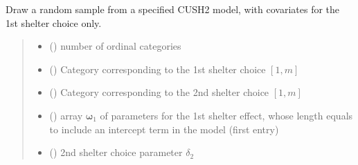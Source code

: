\documentclass[letterpaper,10pt,english]{sphinxmanual}
\begin{document}

\begin{fulllineitems}
\label{\detokenize{cubmods:cubmods.cush2_x0.draw}}
\pysigstartsignatures
{}
\pysigstopsignatures
\sphinxAtStartPar
Draw a random sample from a specified CUSH2 model,
with covariates for the 1st shelter choice only.
\begin{quote}\begin{description}
\begin{itemize}
\item {} 
\sphinxAtStartPar
{} () \textendash{} number of ordinal categories

\item {} 
\sphinxAtStartPar
{} () \textendash{} Category corresponding to the 1st shelter choice \([1,m]\)

\item {} 
\sphinxAtStartPar
{} () \textendash{} Category corresponding to the 2nd shelter choice \([1,m]\)

\item {} 
\sphinxAtStartPar
{} () \textendash{} array \(\pmb \omega_1\) of parameters for the 1st shelter effect, whose length equals 
 to include an intercept term in the model (first entry)

\item {} 
\sphinxAtStartPar
{} () \textendash{} 2nd shelter choice parameter \(\delta_2\)


\end{itemize}
\end{description}
\end{quote}
\end{fulllineitems}
\end{document}
